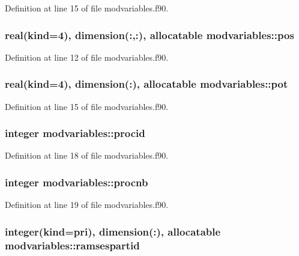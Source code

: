 Definition at line 15 of file modvariables.\-f90.

\hypertarget{classmodvariables_a2f72d5750b0cf2e9bfa6e139d09c6862}{
\subsubsection[{pos}]{\setlength{\rightskip}{0pt plus 5cm}real(kind=4), dimension(\-:,\-:), allocatable modvariables\-::pos}}\label{classmodvariables_a2f72d5750b0cf2e9bfa6e139d09c6862}


Definition at line 12 of file modvariables.\-f90.

\hypertarget{classmodvariables_a872451e872cc528b38bd43f2ed09b446}{
\subsubsection[{pot}]{\setlength{\rightskip}{0pt plus 5cm}real(kind=4), dimension(\-:), allocatable modvariables\-::pot}}\label{classmodvariables_a872451e872cc528b38bd43f2ed09b446}


Definition at line 15 of file modvariables.\-f90.

\hypertarget{classmodvariables_a27cda3ac7f6a8948a5f95e7dfa724167}{
\subsubsection[{procid}]{\setlength{\rightskip}{0pt plus 5cm}integer modvariables\-::procid}}\label{classmodvariables_a27cda3ac7f6a8948a5f95e7dfa724167}


Definition at line 18 of file modvariables.\-f90.

\hypertarget{classmodvariables_ae51b502acd90a80a0134e81f92fbac15}{
\subsubsection[{procnb}]{\setlength{\rightskip}{0pt plus 5cm}integer modvariables\-::procnb}}\label{classmodvariables_ae51b502acd90a80a0134e81f92fbac15}


Definition at line 19 of file modvariables.\-f90.

\hypertarget{classmodvariables_aad55ee2cd6f458e86f0f8fa31339fac1}{
\subsubsection[{ramsespartid}]{\setlength{\rightskip}{0pt plus 5cm}integer(kind=pri), dimension(\-:), allocatable modvariables\-::ramsespartid}}\label{classmodvariables_aad55ee2cd6f458e86f0f8fa31339fac1}


